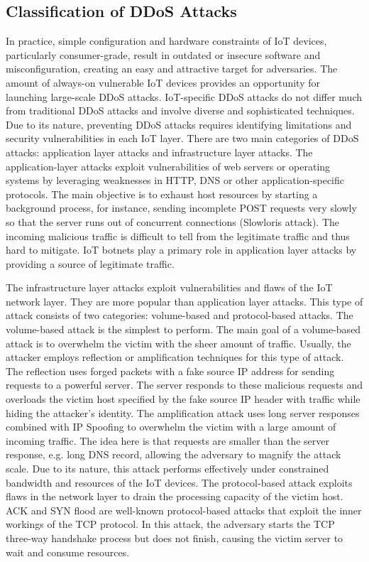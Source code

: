 \documentclass[conference, 11pt]{IEEEtran}
\begin{document}
\subsection{Classification of DDoS Attacks}
In practice, simple configuration and hardware constraints of IoT devices, particularly consumer-grade, result in outdated or insecure software and misconfiguration, creating an easy and attractive target for adversaries.
The amount of always-on vulnerable IoT devices provides an opportunity for launching large-scale DDoS attacks.
IoT-specific DDoS attacks do not differ much from traditional DDoS attacks and involve diverse and sophisticated techniques.
Due to its nature, preventing DDoS attacks requires identifying limitations and security vulnerabilities in each IoT layer.
There are two main categories of DDoS attacks: application layer attacks and infrastructure layer attacks.
The application-layer attacks exploit vulnerabilities of web servers or operating systems by leveraging weaknesses in HTTP, DNS or other application-specific protocols.
The main objective is to exhaust host resources by starting a background process, for instance, sending incomplete POST requests very slowly so that the server runs out of concurrent connections (Slowloris attack).
The incoming malicious traffic is difficult to tell from the legitimate traffic and thus hard to mitigate.
IoT botnets play a primary role in application layer attacks by providing a source of legitimate traffic.

The infrastructure layer attacks exploit vulnerabilities and flaws of the IoT network layer.
They are more popular than application layer attacks.
This type of attack consists of two categories: volume-based and protocol-based attacks.
The volume-based attack is the simplest to perform.
The main goal of a volume-based attack is to overwhelm the victim with the sheer amount of traffic.
Usually, the attacker employs reflection or amplification techniques for this type of attack.
The reflection uses forged packets with a fake source IP address for sending requests to a powerful server.
The server responds to these malicious requests and overloads the victim host specified by the fake source IP header with traffic while hiding the attacker's identity.
The amplification attack uses long server responses combined with IP Spoofing to overwhelm the victim with a large amount of incoming traffic.
The idea here is that requests are smaller than the server response, e.g. long DNS record, allowing the adversary to magnify the attack scale.
Due to its nature, this attack performs effectively under constrained bandwidth and resources of the IoT devices.
The protocol-based attack exploits flaws in the network layer to drain the processing capacity of the victim host.
ACK and SYN flood are well-known protocol-based attacks that exploit the inner workings of the TCP protocol.
In this attack, the adversary starts the TCP three-way handshake process but does not finish, causing the victim server to wait and consume resources.
\end{document}
